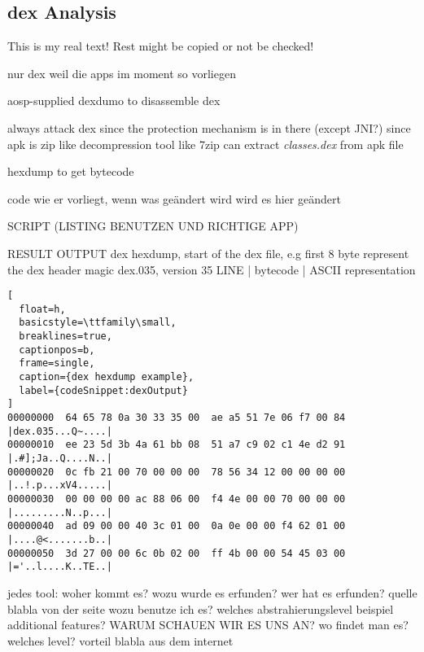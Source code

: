 \subsection{dex Analysis} \label{subsection:tools-dex}
This is my real text! Rest might be copied or not be checked!


%
nur dex weil die apps im moment so vorliegen

aosp-supplied dexdumo to disassemble dex

\cite{andevconDalvikART}
%
%
always attack dex since the protection mechanism is in there (except JNI?)
since apk is zip like decompression tool like 7zip can extract \textit{classes.dex} from apk file

hexdump to get bytecode


code wie er vorliegt, wenn was geändert wird wird es hier geändert



SCRIPT (LISTING BENUTZEN UND RICHTIGE APP)

RESULT OUTPUT
dex hexdump, start of the dex file, e.g first 8 byte represent the dex header magic dex.035, version 35\cite{developersDalvik}
LINE | bytecode | ASCII representation
\begin{lstlisting}[
  float=h,
  basicstyle=\ttfamily\small,
  breaklines=true,
  captionpos=b,
  frame=single,
  caption={dex hexdump example},
  label={codeSnippet:dexOutput}
]
00000000  64 65 78 0a 30 33 35 00  ae a5 51 7e 06 f7 00 84  |dex.035...Q~....|
00000010  ee 23 5d 3b 4a 61 bb 08  51 a7 c9 02 c1 4e d2 91  |.#];Ja..Q....N..|
00000020  0c fb 21 00 70 00 00 00  78 56 34 12 00 00 00 00  |..!.p...xV4.....|
00000030  00 00 00 00 ac 88 06 00  f4 4e 00 00 70 00 00 00  |.........N..p...|
00000040  ad 09 00 00 40 3c 01 00  0a 0e 00 00 f4 62 01 00  |....@<.......b..|
00000050  3d 27 00 00 6c 0b 02 00  ff 4b 00 00 54 45 03 00  |='..l....K..TE..|
\end{lstlisting}





jedes tool:\newline
woher kommt es?\newline
wozu wurde es erfunden?\newline
wer hat es erfunden? quelle\newline
blabla von der seite\newline
wozu benutze ich es?\newline
welches abstrahierungslevel\newline
beispiel\newline
additional features?\newline
WARUM SCHAUEN WIR ES UNS AN?\newline
wo findet man es?\newline
welches level?\newline
vorteil\newline
blabla aus dem internet\newline
